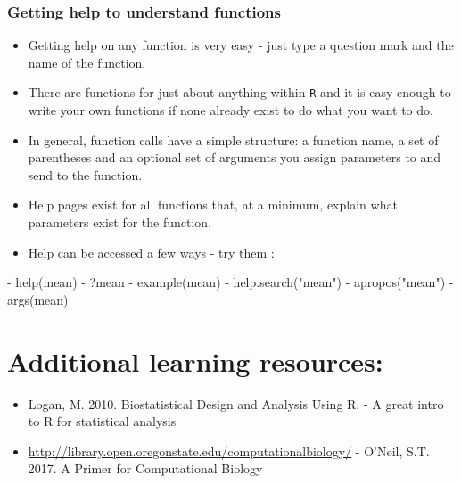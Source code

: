 \documentclass[
]{book}
\newenvironment{Shaded}{\begin{snugshade}}{\end{snugshade}}
\newcommand{\FunctionTok}[1]{\textcolor[rgb]{0.00,0.00,0.00}{#1}}
\newcommand{\NormalTok}[1]{#1}
\newcommand{\SpecialCharTok}[1]{\textcolor[rgb]{0.00,0.00,0.00}{#1}}
\newcommand{\StringTok}[1]{\textcolor[rgb]{0.31,0.60,0.02}{#1}}
\begin{document}
\hypertarget{getting-help-to-understand-functions}{%
\subsubsection{Getting help to understand functions}\label{getting-help-to-understand-functions}}

\begin{itemize}
\item
  Getting help on any function is very easy - just type a question mark and the name of the function.
\item
  There are functions for just about anything within \texttt{R} and it is easy enough to write your own functions if none already exist to do what you want to do.
\item
  In general, function calls have a simple structure: a function name, a set of parentheses and an optional set of arguments you assign parameters to and send to the function.
\item
  Help pages exist for all functions that, at a minimum, explain what parameters exist for the function.
\item
  Help can be accessed a few ways - try them :
\end{itemize}

\begin{Shaded}
\begin{Highlighting}[]
\SpecialCharTok{{-}} \FunctionTok{help}\NormalTok{(mean)}
\SpecialCharTok{{-}}\NormalTok{ ?mean}
\SpecialCharTok{{-}} \FunctionTok{example}\NormalTok{(mean)}
\SpecialCharTok{{-}} \FunctionTok{help.search}\NormalTok{(}\StringTok{"mean"}\NormalTok{)}
\SpecialCharTok{{-}} \FunctionTok{apropos}\NormalTok{(}\StringTok{"mean"}\NormalTok{)}
\SpecialCharTok{{-}} \FunctionTok{args}\NormalTok{(mean)}
\end{Highlighting}
\end{Shaded}

\hypertarget{additional-learning-resources-1}{%
\section{Additional learning resources:}\label{additional-learning-resources-1}}

\begin{itemize}
\item
  Logan, M. 2010. Biostatistical Design and Analysis Using R. - A great intro to R for statistical analysis
\item
  \url{http://library.open.oregonstate.edu/computationalbiology/} - O'Neil, S.T. 2017. A Primer for Computational Biology
\end{itemize}
\end{document}
